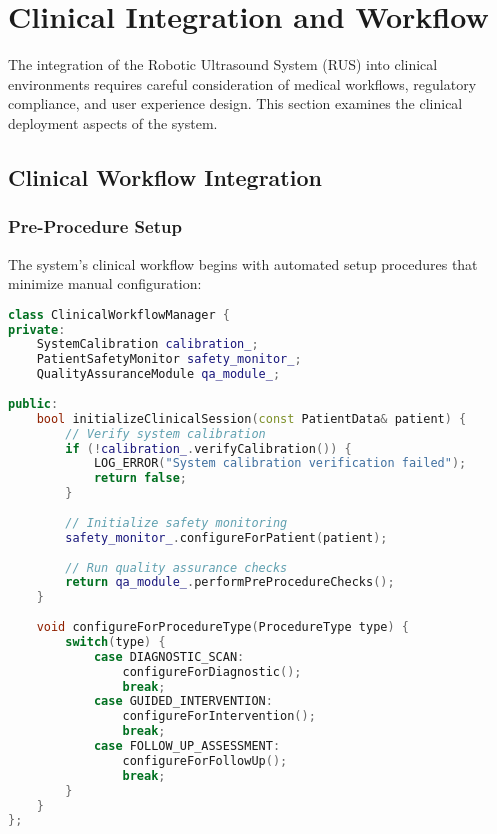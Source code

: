 \section{Clinical Integration and Workflow}
\label{sec:clinical-integration}

The integration of the Robotic Ultrasound System (RUS) into clinical environments requires careful consideration of medical workflows, regulatory compliance, and user experience design. This section examines the clinical deployment aspects of the system.

\subsection{Clinical Workflow Integration}

\subsubsection{Pre-Procedure Setup}
The system's clinical workflow begins with automated setup procedures that minimize manual configuration:

\begin{lstlisting}[language=C++, caption={Clinical Setup Protocol}, label={lst:clinical-setup}]
class ClinicalWorkflowManager {
private:
    SystemCalibration calibration_;
    PatientSafetyMonitor safety_monitor_;
    QualityAssuranceModule qa_module_;
    
public:
    bool initializeClinicalSession(const PatientData& patient) {
        // Verify system calibration
        if (!calibration_.verifyCalibration()) {
            LOG_ERROR("System calibration verification failed");
            return false;
        }
        
        // Initialize safety monitoring
        safety_monitor_.configureForPatient(patient);
        
        // Run quality assurance checks
        return qa_module_.performPreProcedureChecks();
    }
    
    void configureForProcedureType(ProcedureType type) {
        switch(type) {
            case DIAGNOSTIC_SCAN:
                configureForDiagnostic();
                break;
            case GUIDED_INTERVENTION:
                configureForIntervention();
                break;
            case FOLLOW_UP_ASSESSMENT:
                configureForFollowUp();
                break;
        }
    }
};
\end{lstlisting}

